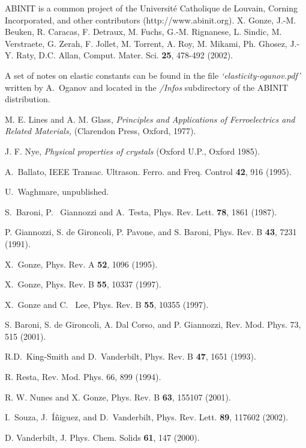 \documentclass[11pt,fleqn]{article}
\begin{document}
\begin{thebibliography}{99}

 {\sf ABINIT} is a common project of the
Universit\'{e} Catholique de Louvain,
Corning Incorporated, and other contributors (http://www.abinit.org).
X. Gonze, J.-M. Beuken, R. Caracas, F. Detraux, M. Fuchs, G.-M. Rignanese,
L. Sindic, M. Verstraete, G. Zerah, F. Jollet, M. Torrent, A. Roy,
M. Mikami, Ph. Ghosez, J.-Y. Raty, D.C. Allan,
Comput. Mater. Sci. {\bf 25}, 478-492 (2002).

A set of notes on elastic constants can be found in the file
{\sl `elasticity-oganov.pdf'} written by A.~Oganov and located in
the {\sl /Infos} subdirectory of the {\sf ABINIT} distribution.

 M. E. Lines and A. M. Glass, {\it Principles and
Applications of Ferroelectrics and Related Materials,} (Clarendon
Press, Oxford, 1977).

 J. F. Nye, {\it Physical properties of crystals}
(Oxford U.P., Oxford 1985).

 A.~Ballato, IEEE Transac. Ultrason. Ferro. and
Freq. Control {\bf 42}, 916 (1995).

 U.~Waghmare, unpublished.

 S.~Baroni, P. ~Giannozzi and A.~Testa,
Phys. Rev. Lett. {\bf 78}, 1861 (1987).

 P. Giannozzi, S. de Gironcoli, P. Pavone, and S. Baroni,
Phys. Rev. B {\bf 43}, 7231 (1991).

 X.~Gonze, Phys. Rev. A {\bf 52}, 1096 (1995).

  X.~Gonze,
Phys. Rev. B {\bf 55}, 10337 (1997).

 X.~Gonze and C. ~Lee, Phys. Rev. B {\bf 55}, 10355 (1997).

 S. Baroni, S. de Gironcoli, A. Dal Corso,
and P. Giannozzi, Rev. Mod. Phys. 73, 515 (2001).

 R.D.~King-Smith and D.~Vanderbilt,
Phys. Rev. B {\bf 47}, 1651 (1993).

 R. Resta, Rev. Mod. Phys. 66, 899 (1994).

 R. W. Nunes and X. Gonze, Phys. Rev. B {\bf 63}, 155107
(2001).

 I.~Souza, J.~\'I\~niguez, and D.~Vanderbilt,
Phys. Rev. Lett. {\bf 89}, 117602 (2002).

 D. Vanderbilt, J. Phys. Chem. Solids {\bf 61}, 147 (2000).

\end{thebibliography}
\end{document}
